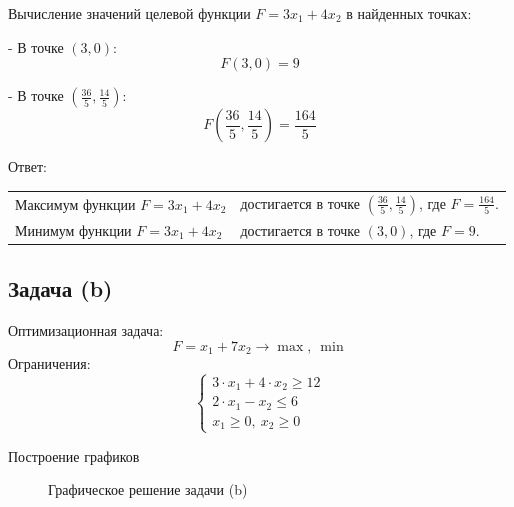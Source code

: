 \documentclass{article}
\begin{document}
Вычисление значений целевой функции \(F = 3x_1 + 4x_2\) в найденных точках:

- В точке \((3, 0)\):
\[
    F(3, 0) = 9
\]

- В точке \(\left(\frac{36}{5}, \frac{14}{5}\right)\):
\[
    F\left(\frac{36}{5}, \frac{14}{5}\right) = \frac{164}{5}
\]

Ответ:
\begin{tabular}{l l}
    Максимум функции \(F = 3x_1 + 4x_2\) & достигается в точке \(\left(\frac{36}{5}, \frac{14}{5}\right)\), где \(F =\frac{164}{5}\). \\
    Минимум функции \(F = 3x_1 + 4x_2\)  & достигается в точке \((3, 0)\), где \(F = 9\).
\end{tabular}

\newpage

\subsection{Задача (b)}

Оптимизационная задача:
\[
    F = x_1 + 7x_2 \to \max, \ \min
\]
Ограничения:
\[
    \begin{cases}
        3 \cdot x_1 + 4 \cdot x_2 \geq 12 \\
        2 \cdot x_1 - x_2 \leq 6          \\
        x_1 \geq 0, \ x_2 \geq 0
    \end{cases}
\]

Построение графиков

\begin{figure}[h]
    \centering
    \caption{Графическое решение задачи (b)}
\end{figure}
\end{document}
